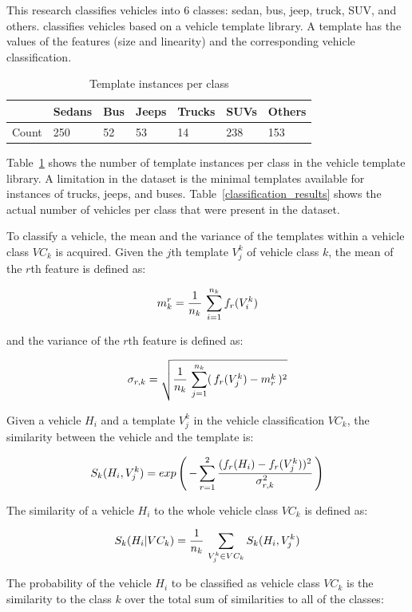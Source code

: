 \documentclass[conference]{IEEEtran}
\begin{document}
This research classifies vehicles into 6 classes: sedan, bus, jeep, truck, SUV, and others.  \cite{Jun-Wei} classifies vehicles based on a vehicle template library. A template has the values of the features (size and linearity) and the corresponding vehicle classification. 
\begin{table}[ht!]
\centering
\caption{Template instances per class}
\label{template_instances}
\begin{tabular}{|l|l|l|l|l|l|l|}
\hline
       & Sedans & Bus & Jeeps & Trucks & SUVs & Others \\ \hline
Count  & 250    & 52  & 53    & 14     & 238  & 153    \\ \hline
\end{tabular}
\end{table}

Table~\ref{template_instances} shows the number of template instances per class in the vehicle template library. A limitation in the dataset is the minimal templates available for instances of trucks, jeeps, and buses. Table~\ref{classification_results} shows the actual number of vehicles per class that were present in the dataset.

To classify a vehicle, the mean and the variance of the templates within a vehicle class $VC_k$ is acquired. Given the $j$th template $V_j^k$ of vehicle class $k$, the mean of the $r$th feature is defined as:

$$
m_k^r = \frac{1}{n_k} \thinspace \sum_{i=1}^{n_k} f_r (V_i^k)
$$

and the variance of the $r$th feature is defined as:

$$
\sigma_{r,k} = \sqrt{ \frac{1}{n_k} \thinspace \sum_{j=1}^{n_k} ( \thinspace f_r (V_j^k) - m_r^k \thinspace ) ^2 }
$$

Given a vehicle $H_i$ and a template $V_j^k$ in the vehicle classification $VC_k$, the similarity between the vehicle and the template is:

$$
S_k (H_i, V_j^k) = exp \left( \thinspace - \sum_{r=1}^{2} \frac{ (f_r(H_i) - f_r(V_j^k) )^2 }{\sigma_{r, k}^2 } \thinspace \right)
$$

The similarity of a vehicle $H_i$ to the whole vehicle class $VC_k$ is defined as:

$$
S_k (H_i | VC_k) = \frac{1}{n_k} \thinspace \sum_{V_j^k \in VC_k } S_k (H_i, V_j^k)
$$

The probability of the vehicle $H_i$ to be classified as vehicle class $VC_k$ is the similarity to the class $k$ over the total sum of similarities to all of the classes:
\end{document}
